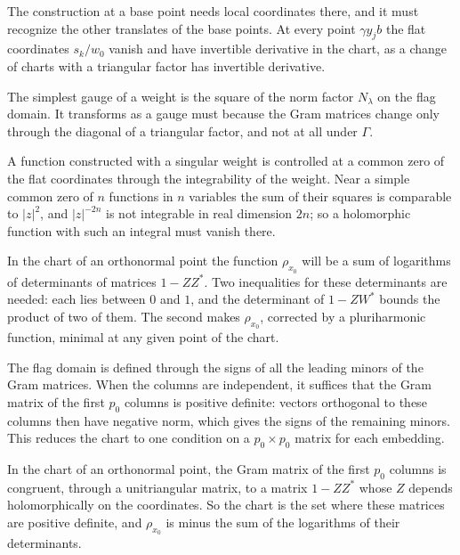 The construction at a base point needs local coordinates there, and it must recognize the other translates of the
base points. At every point $\gamma y_jb$ the flat coordinates $s_k/w_0$ vanish and have invertible derivative in the
chart, as a change of charts with a triangular factor has invertible derivative.

The simplest gauge of a weight is the square of the norm factor $N_\lambda$ on the flag domain. It transforms as a
gauge must because the Gram matrices change only through the diagonal of a triangular factor, and not at all under
$\Gamma$.

A function constructed with a singular weight is controlled at a common zero of the flat coordinates through the
integrability of the weight. Near a simple common zero of $n$ functions in $n$ variables the sum of their squares
is comparable to $|z|^2$, and $|z|^{-2n}$ is not integrable in real dimension $2n$; so a holomorphic function with
such an integral must vanish there.

In the chart of an orthonormal point the function $\rho_{x_0}$ will be a sum of logarithms of determinants of
matrices $1-ZZ^*$. Two inequalities for these determinants are needed: each lies between $0$ and $1$, and the
determinant of $1-ZW^*$ bounds the product of two of them. The second makes $\rho_{x_0}$, corrected by a pluriharmonic
function, minimal at any given point of the chart.

The flag domain is defined through the signs of all the leading minors of the Gram matrices. When the columns are
independent, it suffices that the Gram matrix of the first $p_0$ columns is positive definite: vectors orthogonal to
these columns then have negative norm, which gives the signs of the remaining minors. This reduces the chart to one
condition on a $p_0\times p_0$ matrix for each embedding.

In the chart of an orthonormal point, the Gram matrix of the first $p_0$ columns is congruent, through a unitriangular
matrix, to a matrix $1-ZZ^*$ whose $Z$ depends holomorphically on the coordinates. So the chart is the set where these
matrices are positive definite, and $\rho_{x_0}$ is minus the sum of the logarithms of their determinants.

